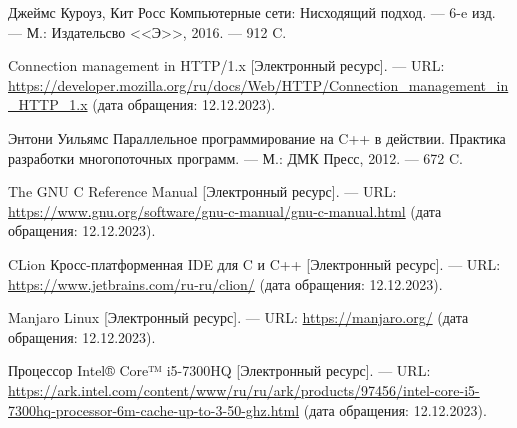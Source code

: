 
\renewcommand\bibname{СПИСОК ИСПОЛЬЗОВАННЫХ ИСТОЧНИКОВ}
\begin{thebibliography}{}

\setlength\bibindent{1.25cm}
\makeatletter
\let\old@biblabel\@biblabel
\def\@biblabel#1{\kern\bibindent\old@biblabel{#1}}
\makeatother

 Джеймс Куроуз, Кит Росс Компьютерные сети: Нисходящий подход. --- 6-e изд. --- М.: Издательсво <<Э>>, 2016. --- 912 C. 

 Connection management in HTTP/1.x [Электронный ресурс]. --- URL: \url{https://developer.mozilla.org/ru/docs/Web/HTTP/Connection_management_in_HTTP_1.x} (дата обращения: 12.12.2023).

 Энтони Уильямс Параллельное программирование на C++ в действии. Практика разработки многопоточных программ. --- М.: ДМК Пресс, 2012. --- 672 C. 

 The GNU C Reference Manual [Электронный ресурс]. --- URL: \url{https://www.gnu.org/software/gnu-c-manual/gnu-c-manual.html} (дата обращения: 12.12.2023).

 CLion Кросс-платформенная IDE для C и C++ [Электронный ресурс]. --- URL: \url{https://www.jetbrains.com/ru-ru/clion/} (дата обращения: 12.12.2023).

 Manjaro Linux [Электронный ресурс]. --- URL: \url{https://manjaro.org/} (дата обращения: 12.12.2023).

 Процессор Intel® Core™ i5-7300HQ [Электронный ресурс]. --- URL: \url{https://ark.intel.com/content/www/ru/ru/ark/products/97456/intel-core-i5-7300hq-processor-6m-cache-up-to-3-50-ghz.html} (дата обращения: 12.12.2023).

\end{thebibliography}


